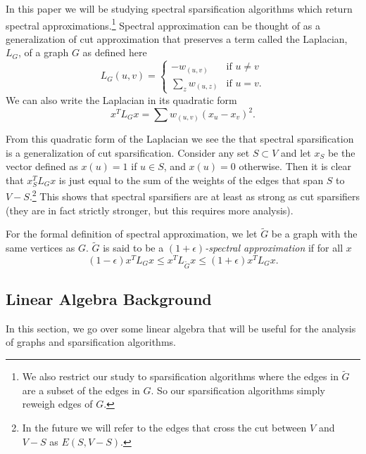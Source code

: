 \documentclass[12pt,twoside]{article}
\begin{document}
In this paper we will be studying spectral sparsification algorithms which return spectral approximations.\footnote{We also restrict our study to sparsification algorithms where the edges in $\tilde{G}$ are a subset of the edges in $G$. So our sparsification algorithms simply reweigh edges of $G$.} Spectral approximation can be thought of as a generalization of cut approximation that preserves a term called the Laplacian, $L_G$, of a graph $G$ as defined here
%
\begin{equation}
\label{eqn:laplacian-matrix-def}
L_G(u,v) = 
            \begin{cases} 
                -w_{(u,v)}           &\mbox{if } u \not= v \\
                \sum_z w_{(u,z)}     &\mbox{if } u = v. 
            \end{cases}
\end{equation}
%
We can also write the Laplacian in its quadratic form
%
\begin{equation}
\label{eqn:laplacian-vertex-def}
x^T L_G x = \sum w_{(u,v)} (x_u-x_v)^2.
\end{equation}

From this quadratic form of the Laplacian we see the that spectral sparsification is a generalization of cut sparsification. Consider any set $S \subset V$ and let $x_S$ be the vector defined as $x(u) = 1$ if $u \in S$, and $x(u) = 0$ otherwise. Then it is clear that $x_S^T L_G x$ is just equal to the sum of the weights of the edges that span $S$ to $V - S$.\footnote{In the future we will refer to the edges that cross the cut between $V$ and $V-S$ as $E(S, V-S)$.} This shows that spectral sparsifiers are at least as strong as cut sparsifiers (they are in fact strictly stronger, but this requires more analysis). 
 
For the formal definition of spectral approximation, we let $\tilde{G}$ be a graph with the same vertices as $G$. $\tilde{G}$ is said to be a \emph{$(1+\epsilon)$-spectral approximation} if for all $x$
%
\begin{equation}
\label{eqn:spectral-sparsifier-def}
(1-\epsilon) x^T L_G x \leq x^T L_{\tilde{G}} x \leq (1+\epsilon) x^T L_G x.
\end{equation}

\subsection{Linear Algebra Background} 

In this section, we go over some linear algebra that will be useful for the analysis of graphs and sparsification algorithms.
\end{document}
